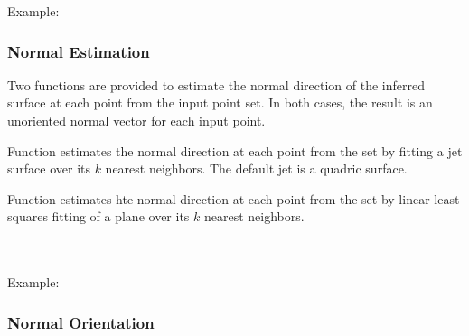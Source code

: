 Example:



\subsubsection{Normal Estimation}

Two functions are provided to estimate the normal direction of the inferred surface at each point from the input point set.
In both cases, the result is an unoriented normal vector for each input point.

Function  estimates the normal direction at each point from the set
by fitting a jet surface over its $k$ nearest neighbors. The default jet is a quadric surface.

Function  estimates hte normal direction at each point from the set
by linear least squares fitting of a plane over its $k$ nearest neighbors.

  \\
  \\


Example:



\subsubsection{Normal Orientation}


